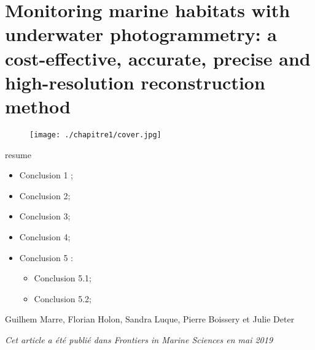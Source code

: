 \chapter{Monitoring marine habitats with underwater photogrammetry: a cost-effective, accurate, precise and high-resolution reconstruction method} \label{chapitre1-methode}

\pagestyle{main}
\begin{figure}[H] 
	\begin{center}
	\texttt{[image: ./chapitre1/cover.jpg]}
    \end{center}
\end{figure}

\begin{colbox}{resume}
  \vspace{-2pt}
{\color{textresume}\small
\begin{itemize}[leftmargin=0in]\itemsep3pt
\item Conclusion 1 ;
\item Conclusion 2;
\item Conclusion 3;
\item Conclusion 4;
\item Conclusion 5 :
\begin{itemize}
  \item Conclusion 5.1;
  \item Conclusion 5.2;
\end{itemize}
\end{itemize}
}

\vspace{-2pt}
\end{colbox}

\clearpage

\normalsize
\medskip

\noindent Guilhem Marre, Florian Holon, Sandra Luque, Pierre Boissery et Julie Deter

\medskip

\noindent\textit{Cet article a été publié dans Frontiers in Marine Sciences en mai 2019}

\medskip

